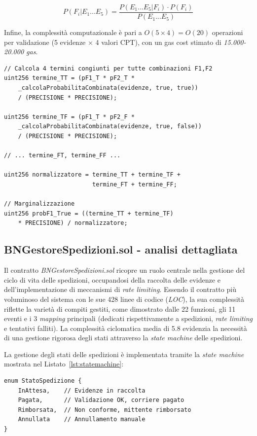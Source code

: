 \[
P(F_i | E_1...E_5) = \frac{P(E_1...E_5 | F_i) \cdot P(F_i)}{P(E_1...E_5)}
\]

Infine, la complessità computazionale è pari a $O(5 \times 4) = O(20)$ operazioni per validazione (5 evidenze × 4 valori CPT), con un gas cost stimato di \textit{15.000-20.000 gas}.


\begin{lstlisting}[language=Solidity, caption={Inferenza Bayesiana}]
// Calcola 4 termini congiunti per tutte combinazioni F1,F2
uint256 termine_TT = (pF1_T * pF2_T * 
    _calcolaProbabilitaCombinata(evidenze, true, true)) 
    / (PRECISIONE * PRECISIONE);

uint256 termine_TF = (pF1_T * pF2_F * 
    _calcolaProbabilitaCombinata(evidenze, true, false)) 
    / (PRECISIONE * PRECISIONE);

// ... termine_FT, termine_FF ...

uint256 normalizzatore = termine_TT + termine_TF + 
                         termine_FT + termine_FF;

// Marginalizzazione
uint256 probF1_True = ((termine_TT + termine_TF) 
    * PRECISIONE) / normalizzatore;
\end{lstlisting}


\subsection{BNGestoreSpedizioni.sol - analisi dettagliata}

Il contratto \textit{BNGestoreSpedizioni.sol} ricopre un ruolo centrale nella gestione del ciclo di vita delle spedizioni, occupandosi della raccolta delle evidenze e dell'implementazione di meccanismi di \textit{rate limiting}. Essendo il contratto più voluminoso del sistema con le sue 428 linee di codice (\textit{LOC}), la sua complessità riflette la varietà di compiti gestiti, come dimostrato dalle 22 funzioni, gli 11 eventi e i 3 \textit{mapping} principali (dedicati rispettivamente a spedizioni, \textit{rate limiting} e tentativi falliti). La complessità ciclomatica media di 5.8 evidenzia la necessità di una gestione rigorosa degli stati attraverso la \textit{state machine} delle spedizioni.

La gestione degli stati delle spedizioni è implementata tramite la \textit{state machine} mostrata nel Listato~\ref{lst:statemachine}:

\begin{lstlisting}[language=Solidity, caption={State machine delle spedizioni}, label=lst:statemachine]
enum StatoSpedizione {
    InAttesa,    // Evidenze in raccolta
    Pagata,      // Validazione OK, corriere pagato
    Rimborsata,  // Non conforme, mittente rimborsato
    Annullata    // Annullamento manuale
}
\end{lstlisting}

